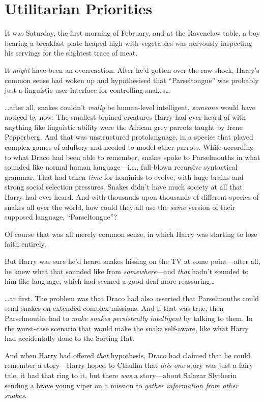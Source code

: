 \chapter{Utilitarian Priorities}\label{utilitarian-priorities}

It was Saturday, the first morning of February, and at the Ravenclaw
table, a boy bearing a breakfast plate heaped high with vegetables was
nervously inspecting his servings for the slightest trace of meat.

It \emph{might} have been an overreaction. After he'd gotten over the
raw shock, Harry's common sense had woken up and hypothesised that
``Parseltongue'' was probably just a linguistic user interface for
controlling snakes\ldots{}

\ldots{}after all, snakes couldn't \emph{really} be human-level
intelligent, \emph{someone} would have noticed by now. The
smallest-brained creatures Harry had ever heard of with anything like
linguistic ability were the African grey parrots taught by Irene
Pepperberg. And that was unstructured protolanguage, in a species that
played complex games of adultery and needed to model other parrots.
While according to what Draco had been able to remember, snakes spoke to
Parselmouths in what sounded like normal human language---i.e.,
full-blown recursive syntactical grammar. That had taken \emph{time} for
hominids to evolve, with huge brains and strong social selection
pressures. Snakes didn't have much society at all that Harry had ever
heard. And with thousands upon thousands of different species of snakes
all over the world, how could they all use the \emph{same} version of
their supposed language, ``Parseltongue''?

Of course that was all merely common sense, in which Harry was starting
to lose faith entirely.

But Harry was sure he'd heard snakes hissing on the TV at some
point---after all, he knew what that sounded like from
\emph{somewhere}---and \emph{that} hadn't sounded to him like language,
which had seemed a good deal more reassuring\ldots{}

\ldots{}at first. The problem was that Draco had also asserted that
Parselmouths could send snakes on extended complex missions. And if that
was true, then Parselmouths had to \emph{make snakes persistently
intelligent} by talking to them. In the worst-case scenario that would
make the snake self-aware, like what Harry had accidentally done to the
Sorting Hat.

And when Harry had offered \emph{that} hypothesis, Draco had claimed
that he could remember a story---Harry hoped to Cthulhu that \emph{this
one} story was just a fairy tale, it had that ring to it, but there
\emph{was} a story---about Salazar Slytherin sending a brave young viper
on a mission to \emph{gather information from other snakes.}

